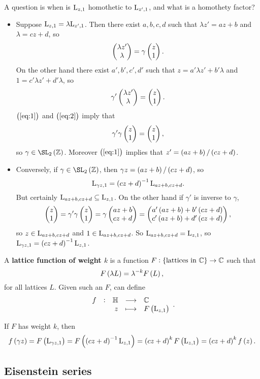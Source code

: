 A question is when is $ \mathrm{L}_{z, 1} $ homothetic to $ \mathrm{L}_{z', 1} $, and what is a homothety factor?
\begin{itemize}
\item Suppose $ \mathrm{L}_{z, 1} = \lambda \mathrm{L}_{z', 1} $. Then there exist $ a, b, c, d $ such that $ \lambda z' = az + b $ and $ \lambda = cz + d $, so
\begin{equation}
\label{eq:1}
\begin{pmatrix} \lambda z' \\ \lambda \end{pmatrix} = \gamma\begin{pmatrix} z \\ 1 \end{pmatrix}.
\end{equation}
On the other hand there exist $ a', b', c', d' $ such that $ z = a'\lambda z' + b'\lambda $ and $ 1 = c'\lambda z' + d'\lambda $, so
\begin{equation}
\label{eq:2}
\gamma'\begin{pmatrix} \lambda z' \\ \lambda \end{pmatrix} = \begin{pmatrix} z \\ 1 \end{pmatrix}.
\end{equation}
$ \br{\ref{eq:1}} $ and $ \br{\ref{eq:2}} $ imply that
$$ \gamma'\gamma\begin{pmatrix} z \\ 1 \end{pmatrix} = \begin{pmatrix} z \\ 1 \end{pmatrix}, $$
so $ \gamma \in \SL_2\br{\ZZ} $. Moreover $ \br{\ref{eq:1}} $ implies that $ z' = \br{az + b} / \br{cz + d} $.
\item Conversely, if $ \gamma \in \SL_2\br{\ZZ} $, then $ \gamma z = \br{az + b} / \br{cz + d} $, so
$$ \L_{\gamma z, 1} = \br{cz + d}^{-1}\L_{az + b, cz + d}. $$
But certainly $ \mathrm{L}_{az + b, cz + d} \subseteq \mathrm{L}_{z, 1} $. On the other hand if $ \gamma' $ is inverse to $ \gamma $,
$$ \twobyone{z}{1} = \gamma'\gamma\twobyone{z}{1} = \gamma\twobyone{az + b}{cz + d} = \twobyone{a'\br{az + b} + b'\br{cz + d}}{c'\br{az + b} + d'\br{cz + d}}, $$
so $ z \in \mathrm{L}_{az + b, cz + d} $ and $ 1 \in \mathrm{L}_{az + b, cz + d} $. So $ \mathrm{L}_{az + b, cz + d} = \mathrm{L}_{z, 1} $, so $ \L_{\gamma z, 1} = \br{cz + d}^{-1}\L_{z, 1} $.
\end{itemize}

\begin{definition}
A \textbf{lattice function of weight $ k $} is a function $ F : \cbr{\text{lattices in} \ \CC} \to \CC $ such that
$$ F\br{\lambda L} = \lambda^{-k}F\br{L}, $$
for all lattices $ L $. Given such an $ F $, can define
$$ \function[f]{\HH}{\CC}{z}{F\br{\L_{z, 1}}}. $$
\end{definition}

If $ F $ has weight $ k $, then
$$ f\br{\gamma z} = F\br{\L_{\gamma z, 1}} = F\br{\br{cz + d}^{-1}\L_{z, 1}} = \br{cz + d}^kF\br{\L_{z, 1}} = \br{cz + d}^kf\br{z}. $$

\pagebreak

\subsection{Eisenstein series}


